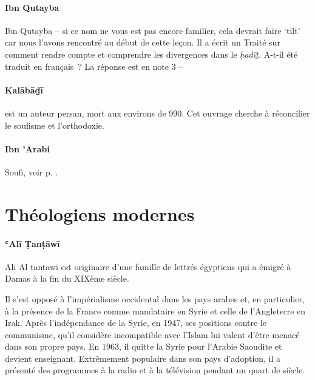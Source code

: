 \paragraph{Ibn Qutayba}
Ibn Qutayba -- si ce nom ne vous est pas encore familier, cela devrait
faire `tilt' car nous l'avons rencontré au début de cette leçon. Il a
écrit un Traité sur comment rendre compte et comprendre les divergences
dans le \emph{ḥadīṯ.} A-t-il été traduit en français~? La réponse est en
note 3 --
\pageref{Theol:IbnQutayba1}
\paragraph{Kalābāḏī}
  est un auteur persan, mort aux environs de 990. Cet ouvrage
cherche à réconcilier le soufisme et l'orthodoxie. 
\pageref{theol:Kalabadi}


\paragraph{Ibn 'Arabi} Soufi, voir p. \pageref{Theo:IbnArabi}.




\section{Théologiens modernes}

\paragraph{ʿAlī Ṭanṭāwī} \label{theo:AliAlTawani}
{Ali Al tantawi est originaire d'une
famille de lettrés égyptiens qui a émigré à Damas à la fin du XIXème
siècle.


Il s'est opposé à l'impérialisme occidental dans les pays
arabes et, en particulier, à la présence de la France comme mandataire
en Syrie et celle de l'Angleterre en Irak. Après l'indépendance de la
Syrie, en 1947, ses positions contre le communisme, qu'il considère
incompatible avec l'Islam lui valent d'être menacé dans son propre pays.
En 1963, il quitte la Syrie pour l'Arabie Saoudite et devient
enseignant.
Extrêmement populaire dans son pays d'adoption, il a
présenté des programmes à la radio et à la télévision pendant un quart
de
siècle.}

